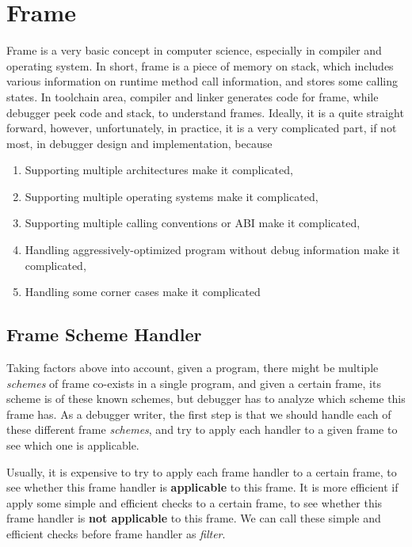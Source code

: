 
\chapter{Frame}
\label{chap:fram}
Frame is a very basic concept in computer science, especially in compiler
and operating system.  In short, frame is a piece of memory on stack, which
includes various information on runtime method call information, and stores
some calling states.  In toolchain area, compiler and linker generates code for
frame, while debugger peek code and stack, to understand frames.  Ideally, it
is a quite straight forward, however, unfortunately, in practice, it is a very complicated part,
if not most, in debugger design and implementation, because
\begin{enumerate}
  \item Supporting multiple architectures make it complicated,
  \item Supporting multiple operating systems make it complicated,
  \item Supporting multiple calling conventions or ABI make it complicated,
  \item Handling aggressively-optimized program without debug information make it complicated,
  \item Handling some corner cases make it complicated
\end{enumerate}

\section{Frame Scheme Handler}
Taking factors above into account, given a program, there might be multiple \textit{schemes}
of frame co-exists in a single program, and given a certain frame, its scheme is of these
known schemes, but debugger has to analyze which scheme this frame has.  As a debugger writer,
the first step is that we should handle each of these different frame \textit{schemes}, and
try to apply each handler to a given frame to see which one is applicable.

Usually, it is expensive to try to apply each frame handler to a certain frame, to see whether
this frame handler is \textbf{applicable} to this frame.  It is more efficient
if apply some simple and efficient checks to a certain frame, to see whether this frame handler
is \textbf{not applicable} to this frame.  We can call these simple and efficient checks before
frame handler as \textit{filter}.


